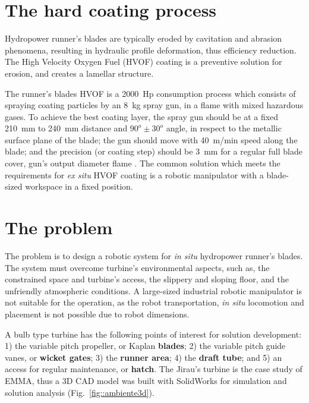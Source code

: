 \section{The hard coating process}

Hydropower runner's blades are typically eroded by cavitation and abrasion
phenomena, resulting in hydraulic profile deformation, thus efficiency
reduction. The High Velocity Oxygen Fuel (HVOF) coating is a preventive
solution for erosion, and creates a lamellar structure. 

The runner's blades HVOF is a 2000~Hp consumption process which consists of
spraying coating particles by an 8~kg spray gun, in a flame with mixed
hazardous gases. To achieve the best coating layer, the spray gun should be at
a fixed 210~mm to 240~mm distance and $90^o \pm 30^o$ angle, in respect to the
metallic surface plane of the blade; the gun should move with 40~m/min speed
along the blade; and the precision (or coating step) should be 3~mm for a
regular full blade cover, gun's output diameter flame \cite{li2002effect}. The
common solution which meets the requirements for \textit{ex situ} HVOF coating
is a robotic manipulator with a blade-sized workspace in a fixed position.

\section{The problem}\label{problem}

The problem is to design a robotic system for \textit{in situ}
hydropower runner's blades. The system must overcome turbine's environmental
aspects, such as, the constrained space and turbine's access, the slippery and sloping
floor, and the unfriendly atmospheric conditions. A large-sized industrial
robotic manipulator is not suitable for the operation, as the robot
transportation, \textit{in situ} locomotion and placement is not possible due
to robot dimensions.

A bulb type turbine has the following points of interest for solution
development: 1) the variable pitch propeller, or Kaplan \textbf{blades}; 2) the
variable pitch guide vanes, or \textbf{wicket gates}; 3) the \textbf{runner
area}; 4) the \textbf{draft tube}; and 5) an access for regular
maintenance, or \textbf{hatch}. The Jirau's turbine is the case study of EMMA,
thus a 3D CAD model was built with SolidWorks\raisebox{1ex}{\textregistered}
for simulation and solution analysis (Fig.~\ref{fig::ambiente3d}).

